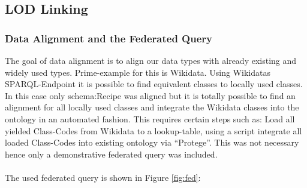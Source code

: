 \documentclass{article}
\begin{document}
\subsection{LOD Linking}
\subsubsection{Data Alignment and the Federated Query}
The goal of data alignment is to align our data types with already existing and widely used types. Prime-example for this is Wikidata. Using Wikidatas SPARQL-Endpoint it is possible to find equivalent classes to locally used classes. In this case only schema:Recipe was aligned but it is totally possible to find an alignment for all locally used classes and integrate the Wikidata classes into the ontology in an automated fashion. This requires certain steps such as: Load all yielded Class-Codes from Wikidata to a lookup-table, using a script integrate all loaded Class-Codes into existing ontology via ``Protege''. This was not necessary hence only a demonstrative federated query was included. \\ \\
The used federated query is shown in Figure \ref{fig:fed}:
\end{document}

